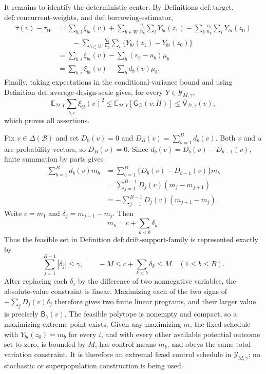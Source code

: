 It remains to identify the deterministic center.  By Definitions \(\mathrm{def:target}\), \(\mathrm{def:concurrent\text{-}weights}\), and \(\mathrm{def:borrowing\text{-}estimator}\),
\[
\begin{aligned}
\widehat\tau(v)-\tau_W
&=\sum_{b,i}\xi_{bi}(v)
+\sum_{b\in W}\frac{q_b}{n_b}\sum_iY_{bi}(z_1)
-\sum_b\frac{v_b}{n_b}\sum_iY_{bi}(z_0)\\
&\qquad-
\sum_{b\in W}\frac{q_b}{n_b}\sum_i
 \{Y_{bi}(z_1)-Y_{bi}(z_0)\}\\
&=\sum_{b,i}\xi_{bi}(v)-\sum_b(v_b-u_b)\mu_b\\
&=\sum_{b,i}\xi_{bi}(v)-\sum_bd_b(v)\mu_b.
\end{aligned}
\]
Finally, taking expectations in the conditional-variance bound and using Definition \(\mathrm{def:average\text{-}design\text{-}scale}\) gives, for every \(Y\in\mathcal Y_{M,\gamma}\),
\[
\mathbb E_{\mathcal D,Y}\sum_{b,i}\xi_{bi}(v)^2
\le \mathbb E_{\mathcal D,Y}[\mathsf G_{\mathcal D}(v;H)]
\le\overline{\mathsf V}_{\mathcal D,\gamma}(v),
\]
which proves all assertions.

Fix \(v\in\Delta(\mathcal B)\) and set \(D_0(v)=0\) and \(D_B(v)=\sum_{b=1}^Bd_b(v)\).  Both \(v\) and \(u\) are probability vectors, so \(D_B(v)=0\).  Since \(d_b(v)=D_b(v)-D_{b-1}(v)\), finite summation by parts gives
\[
\begin{aligned}
\sum_{b=1}^Bd_b(v)m_b
&=\sum_{b=1}^B\{D_b(v)-D_{b-1}(v)\}m_b\\
&=\sum_{j=1}^{B-1}D_j(v)(m_j-m_{j+1})\\
&=-\sum_{j=1}^{B-1}D_j(v)(m_{j+1}-m_j).
\end{aligned}
\]
Write \(c=m_1\) and \(\delta_j=m_{j+1}-m_j\).  Then
\[
m_b=c+\sum_{k<b}\delta_k.
\]
Thus the feasible set in Definition \(\mathrm{def:drift\text{-}support\text{-}family}\) is represented exactly by
\[
\sum_{j=1}^{B-1}|\delta_j|\le\gamma,
\qquad
-M\le c+\sum_{k<b}\delta_k\le M
\quad(1\le b\le B).
\]
After replacing each \(\delta_j\) by the difference of two nonnegative variables, the absolute-value constraint is linear.  Maximizing each of the two signs of
\(-\sum_jD_j(v)\delta_j\) therefore gives two finite linear programs, and their larger value is precisely \(\mathsf B_\gamma(v)\).  The feasible polytope is nonempty and compact, so a maximizing extreme point exists.  Given any maximizing \(m\), the fixed schedule with \(Y_{bi}(z_0)=m_b\) for every \(i\), and with every other available potential outcome set to zero, is bounded by \(M\), has control means \(m_b\), and obeys the same total-variation constraint.  It is therefore an extremal fixed control schedule in \(\mathcal Y_{M,\gamma}\); no stochastic or superpopulation construction is being used.

